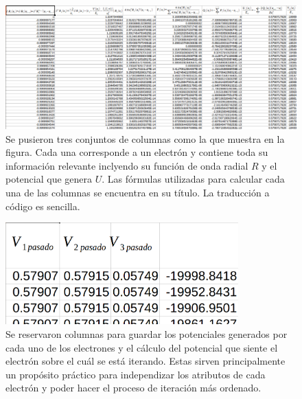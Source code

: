 \documentclass[a4paper]{article}
\begin{document}
\begin{figure}
\begin{center}
\includegraphics[width = \textwidth]{final_atomica_2.png}
\caption{\label{fig:electron}Se pusieron tres conjuntos de columnas como la que muestra en la figura. Cada una corresponde a un electrón y contiene toda su información relevante inclyendo su función de onda radial $R$ y el potencial que genera $U$. Las fórmulas utilizadas para calcular cada una de las columnas se encuentra en su título. La traducción a código es sencilla.}
\end{center}
\end{figure}

\begin{figure}
\begin{center}
\includegraphics[width = 0.8\textwidth]{final_atomica_3.png}
\caption{\label{fig:potenciales}Se reservaron columnas para guardar los potenciales generados por cada uno de los electrones y el cálculo del potencial que siente el electrón sobre el cuál se está iterando. Estas sirven principalmente un propósito práctico para independizar los atributos de cada electrón y poder hacer el proceso de iteración más ordenado.}
\end{center}
\end{figure}
\end{document}
